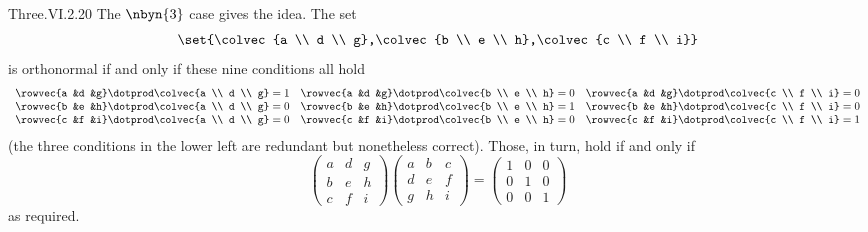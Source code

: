 \begin{ans}{Three.VI.2.20}
      The $\nbyn{3}$ case gives the idea.
      The set
      \begin{equation*}
        \set{\colvec{a \\ d \\ g},\colvec{b \\ e \\ h},\colvec{c \\ f \\ i}}
      \end{equation*}
      is orthonormal if and only if these nine conditions all hold
      \begin{equation*}
        \begin{array}{ccc}
          \rowvec{a &d &g}\dotprod\colvec{a \\ d \\ g}=1
            &\rowvec{a &d &g}\dotprod\colvec{b \\ e \\ h}=0
            &\rowvec{a &d &g}\dotprod\colvec{c \\ f \\ i}=0    \\
          \rowvec{b &e &h}\dotprod\colvec{a \\ d \\ g}=0
            &\rowvec{b &e &h}\dotprod\colvec{b \\ e \\ h}=1
            &\rowvec{b &e &h}\dotprod\colvec{c \\ f \\ i}=0    \\
          \rowvec{c &f &i}\dotprod\colvec{a \\ d \\ g}=0
            &\rowvec{c &f &i}\dotprod\colvec{b \\ e \\ h}=0
            &\rowvec{c &f &i}\dotprod\colvec{c \\ f \\ i}=1
        \end{array}
      \end{equation*}
      (the three conditions in the lower left are redundant but nonetheless
      correct).
      Those, in turn, hold if and only if
      \begin{equation*}
        \begin{pmatrix}
          a &d &g \\
          b &e &h \\
          c &f &i
        \end{pmatrix}
        \begin{pmatrix}
          a &b &c  \\
          d &e &f  \\
          g &h &i
        \end{pmatrix}
        =
        \begin{pmatrix}
          1 &0 &0  \\
          0 &1 &0  \\
          0 &0 &1
        \end{pmatrix}
      \end{equation*}
      as required.


\end{ans}
